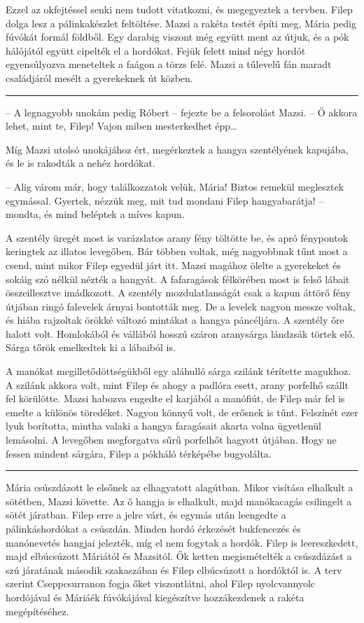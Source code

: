\documentclass[10pt]{memoir}
\renewcommand{\pfbreakdisplay}{\bigskip \ding{166} \bigskip}
\newcommand{\secbreak}{\fancybreak{\pfbreakdisplay}\indent}
\begin{document}
Ezzel az okfejtéssel senki nem tudott vitatkozni, és megegyeztek a tervben.
Filep dolga lesz a pálinkakészlet feltöltése. Mazsi a rakéta testét építi meg,
Mária pedig fúvókát formál földből. Egy darabig viszont még együtt ment az
útjuk, és a pók hálójától együtt cipelték el a hordókat. Fejük felett mind négy
hordót egyensúlyozva meneteltek a faágon a törzs felé. Mazsi a tűlevelű fán
maradt családjáról mesélt a gyerekeknek út közben.

\secbreak

-- A legnagyobb unokám pedig Róbert -- fejezte be a felsorolást Mazsi. -- Ő
akkora lehet, mint te, Filep! Vajon miben mesterkedhet épp\dots

Míg Mazsi utolsó unokájához ért, megérkeztek a hangya szentélyének kapujába, és
le is rakodták a nehéz hordókat.

-- Alig várom már, hogy találkozzatok velük, Mária! Biztos remekül meglesztek
egymással. Gyertek, nézzük meg, mit tud mondani Filep hangyabarátja! --
mondta, és mind beléptek a míves kapun.

A szentély üregét most is varázslatos arany fény töltötte be, és apró
fénypontok keringtek az illatos levegőben. Bár többen voltak, még nagyobbnak
tűnt most a csend, mint mikor Filep egyedül járt itt. Mazsi magához ölelte a
gyerekeket és sokáig szó nélkül nézték a hangyát. A fafaragások félkörében most
is felső lábait összeillesztve imádkozott. A szentély mozdulatlanságát csak a
kapun áttörő fény útjában ringó falevelek árnyai bontották meg. De a levelek
nagyon messze voltak, és hiába rajzoltak örökké változó mintákat a hangya
páncéljára. A szentély őre halott volt. Homlokából és vállából hosszú száron
aranysárga lándzsák törtek elő. Sárga tőrök emelkedtek ki a lábaiból is.

A manókat megilletődöttségükből egy aláhulló sárga szilánk térítette magukhoz.
A szilánk akkora volt, mint Filep és ahogy a padlóra esett, arany porfelhő
szállt fel körülötte. Mazsi habozva engedte el karjából a manófiút, de Filep
már fel is emelte a különös töredéket. Nagyon könnyű volt, de erősnek is tűnt.
Felszínét ezer lyuk borította, mintha valaki a hangya faragásait akarta volna
ügyetlenül lemásolni. A levegőben megforgatva sűrű porfelhőt hagyott útjában.
Hogy ne fessen mindent sárgára, Filep a pókháló térképébe bugyolálta.

\secbreak

Mária csúszdázott le elsőnek az elhagyatott alagútban. Mikor visítása elhalkult
a sötétben, Mazsi követte. Az ő hangja is elhalkult, majd manókacagás
csilingelt a sötét járatban. Filep erre a jelre várt, és egymás után leengedte
a pálinkáshordókat a csúszdán. Minden hordó érkezését bukfencezés és
manónevetés hangjai jelezték, míg el nem fogytak a hordók. Filep is
leereszkedett, majd elbúcsúzott Máriától és Mazsitól. Ők ketten megismételték a
csúszdázást a szú járatának második szakaszában és Filep elbúcsúzott a
hordóktól is. A terv szerint Cseppcsurranon fogja őket viszontlátni, ahol Filep
nyolcvannyolc hordójával és Máriáék fúvókájával kiegészítve hozzákezdenek a
rakéta megépítéséhez.
\end{document}

